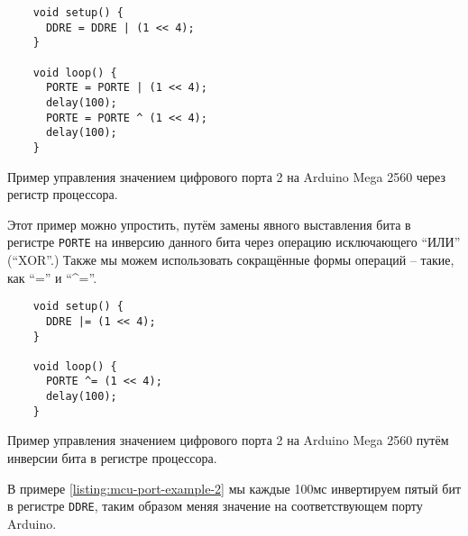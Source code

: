 \documentclass[../sparc.tex]{subfiles}
\begin{document}
\begin{listing}[H]
  \begin{verbatim}
    void setup() {
      DDRE = DDRE | (1 << 4);
    }

    void loop() {
      PORTE = PORTE | (1 << 4);
      delay(100);
      PORTE = PORTE ^ (1 << 4);
      delay(100);
    }
  \end{verbatim}
  \caption{Пример управления значением цифрового порта 2 на Arduino Mega 2560
    через регистр процессора.}
  \label{listing:mcu-port-example-1}
\end{listing}

Этот пример можно упростить, путём замены явного выставления бита в регистре
\texttt{PORTE} на инверсию данного бита через операцию исключающего
``ИЛИ'' (``XOR''.)  Также мы можем использовать сокращённые формы операций --
такие, как ``\textbar='' и ``\^{}=''.

\begin{listing}[H]
  \begin{verbatim}
    void setup() {
      DDRE |= (1 << 4);
    }

    void loop() {
      PORTE ^= (1 << 4);
      delay(100);
    }
  \end{verbatim}
  \caption{Пример управления значением цифрового порта 2 на Arduino Mega 2560
    путём инверсии бита в регистре процессора.}
  \label{listing:mcu-port-example-2}
\end{listing}

В примере \ref{listing:mcu-port-example-2} мы каждые 100мс инвертируем пятый бит
в регистре \texttt{DDRE}, таким образом меняя значение на
соответствующем порту Arduino.
\end{document}
